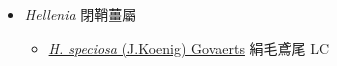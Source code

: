 
  \begin{itemize}
 \item[] \textit{Hellenia} 閉鞘薑屬
                    
  \begin{itemize}
        \item[] \href{http://www.theplantlist.org/tpl1.1/search?q=Hellenia+speciosa}{\textit{H. speciosa} (J.Koenig) Govaerts}     絹毛鳶尾 LC
  \end{itemize}
  \end{itemize}
